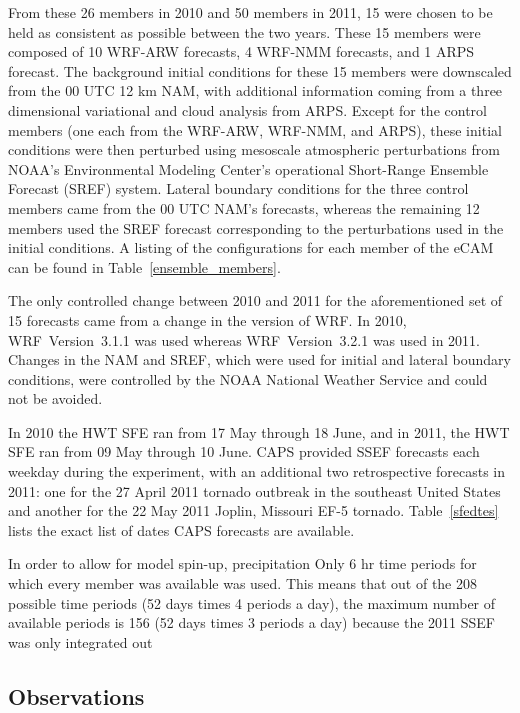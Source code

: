 From these 26 members in 2010 and 50 members in 2011, 15 were chosen to be held as consistent as possible between the two years.
These 15 members were composed of 10 WRF-ARW forecasts, 4 WRF-NMM forecasts, and 1 ARPS forecast.
The background initial conditions for these 15 members were downscaled from the 00 UTC 12 km NAM, with additional information coming from a three dimensional variational and cloud analysis from ARPS.
Except for the control members (one each from the WRF-ARW, WRF-NMM, and ARPS), these initial conditions were then perturbed using mesoscale atmospheric perturbations from NOAA's Environmental Modeling Center's operational Short-Range Ensemble Forecast (SREF) system.
Lateral boundary conditions for the three control members came from the 00 UTC NAM's forecasts, whereas the remaining 12 members used the SREF forecast corresponding to the perturbations used in the initial conditions.
A listing of the configurations for each member of the eCAM can be found in \mbox{Table \ref{ensemble_members}}.


The only controlled change between 2010 and 2011 for the aforementioned set of 15 forecasts came from a change in the version of WRF. In 2010, \mbox{WRF Version 3.1.1} was used whereas \mbox{WRF Version 3.2.1} was used in 2011.
Changes in the NAM and SREF, which were used for initial and lateral boundary conditions, were controlled by the NOAA National Weather Service and could not be avoided.


In 2010 the HWT SFE ran from 17 May through 18 June, and in 2011, the HWT SFE ran from 09  May through 10 June.
CAPS provided SSEF forecasts each weekday during the experiment, with an additional two retrospective forecasts in 2011: one for the 27 April 2011 tornado outbreak in the southeast United States and another for the 22 May 2011 Joplin, Missouri EF-5 tornado.
\mbox{Table \ref{sfedtes}} lists the exact list of dates CAPS forecasts are available.


In order to allow for model spin-up, precipitation
Only 6 hr time periods for which every member was available was used. This means that out of the 208 possible time periods (52 days times 4 periods a day), the maximum number of available periods is 156 (52 days times 3 periods a day) because the 2011 SSEF was only integrated out





\subsection{Observations}
\label{eobservations}

